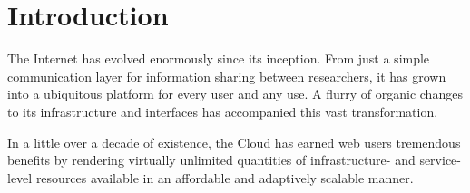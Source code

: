 \section{Introduction}
\label{sec:introduction}

The Internet has evolved enormously since its inception. From just a simple communication layer for information sharing between researchers, it has grown into a ubiquitous platform for every user and any use. 
A flurry of organic changes to its infrastructure and interfaces has accompanied this vast transformation.

In a little over a decade of existence, the Cloud has earned web users tremendous benefits by rendering virtually unlimited quantities of infrastructure- and service-level resources available in an affordable and adaptively scalable manner.

